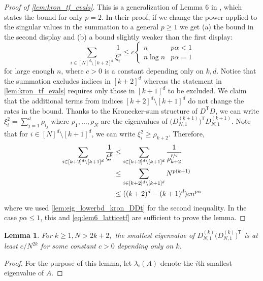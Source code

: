 \documentclass[ejs,noshowframe]{imsart}
\theoremstyle{plain}
\newtheorem{lemma}[theorem]{Lemma}
\theoremstyle{definition}
\renewcommand{\top}{\mathsf{T}}
\begin{document}
\begin{appendix}
\begin{proof}[Proof of \autoref{lem:kron_tf_evals}]
This is a generalization of Lemma 6 in \cite{sadhanala2021multivariate}, 
which
states the bound for only $p=2$. In their proof,
if we change the power
applied to the singular values in the summation to a general $p\geq 1$
we get (a) the bound in the second display and (b) a bound slightly weaker than 
the first display:
	\begin{equation}
		\label{eq:lem6_latticetf}
	\sum_{i \in [N]^d \setminus [k+2]^d} \frac{1}{\xi_{i}^p} 
	\leq c
	\begin{cases}
		n & p \alpha < 1\\
		n \log n & p\alpha = 1
	\end{cases}
\end{equation}
for large enough $n$, where $c>0$ is a constant depending only on  
$k, d$. Notice that the summation excludes indices in $[k+2]^d$ whereas the 
statement in \autoref{lem:kron_tf_evals} requires only those in $[k+1]^d$ to be 
excluded. We claim that the additional terms from indices $[k+2]^d \setminus 
[k+1]^d$ do not change the rates in the bound.
Thanks to the Kronecker-sum structure of $D^\top D$, we can write $\xi_i^2 = 
\sum_{j=1}^d \rho_{i_j}$ where $\rho_1, \dots, \rho_{N}$ 
are the eigenvalues of $ \big(D^{(k+1)}_{N,1}\big)^\top D^{(k+1)}_{N,1}$.
Note that for $i\in [N]^d \setminus [k+1]^d$, we can write $\xi_i^2 \geq 
\rho_{k+2}$. Therefore,
\begin{align*}
\sum_{i \in [k+2]^d \setminus [k+1]^d} \frac{1}{\xi_i^p}
&\leq \sum_{i \in [k+2]^d \setminus [k+1]^d} 
	\frac{1}{\rho_{k+2}^{\nicefrac{p}{2}}}\\
&\leq \sum_{i \in [k+2]^d \setminus [k+1]^d} 	N^{p(k+1)}\\
&\leq ((k+2)^d - (k+1)^d) c n^{p\alpha}
\end{align*}
where we used \autoref{lem:eig_lowerbd_kron_DDt} for the second inequality.
In the case $p\alpha \leq 1$, this and \eqref{eq:lem6_latticetf} are sufficient 
to prove the lemma.
\end{proof}

\begin{lemma}
	\label{lem:eig_lowerbd_kron_DDt}
	For $k\ge 1, N > 2k+2,$ the smallest eigenvalue of $ D^{(k)}_{N,1} 
	\big(D^{(k)}_{N,1} \big)^\top$ 
is at least $c/N^{2k}$ for some constant $c>0$ depending only on $k$.
\end{lemma}
\begin{proof}
	
	
	For the purpose of this lemma, let $\lambda_i(A)$ denote the $i$th smallest 
	eigenvalue of $A$.
	

\end{proof}
\end{appendix}
\end{document}
